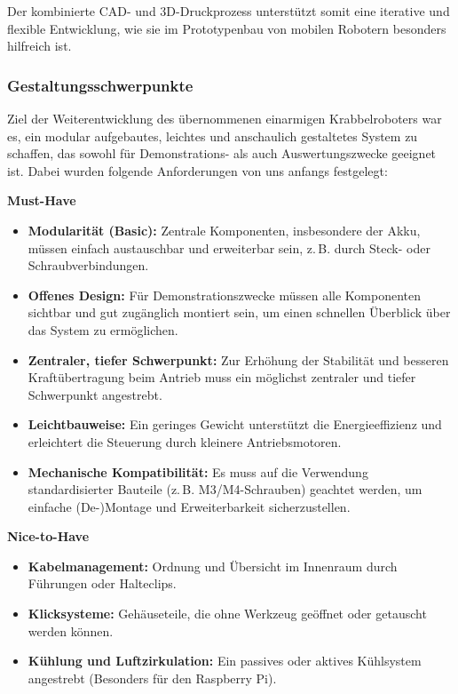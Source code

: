 Der kombinierte CAD- und 3D-Druckprozess unterstützt somit eine iterative und flexible Entwicklung, wie sie im Prototypenbau von mobilen Robotern besonders hilfreich ist.

\subsubsection{Gestaltungsschwerpunkte}

Ziel der Weiterentwicklung des übernommenen einarmigen Krabbelroboters war es, ein modular aufgebautes, leichtes und anschaulich gestaltetes System zu schaffen, das sowohl für Demonstrations- als auch Auswertungszwecke geeignet ist. Dabei wurden folgende Anforderungen von uns anfangs festgelegt:

\textbf{Must-Have}
\begin{itemize}
  \item \textbf{Modularität (Basic):} Zentrale Komponenten, insbesondere der Akku, müssen einfach austauschbar und erweiterbar sein, z.\,B. durch Steck- oder Schraubverbindungen.
  \item \textbf{Offenes Design:} Für Demonstrationszwecke müssen alle Komponenten sichtbar und gut zugänglich montiert sein, um einen schnellen Überblick über das System zu ermöglichen.
  \item \textbf{Zentraler, tiefer Schwerpunkt:} Zur Erhöhung der Stabilität und besseren Kraftübertragung beim Antrieb muss ein möglichst zentraler und tiefer Schwerpunkt angestrebt.
  \item \textbf{Leichtbauweise:} Ein geringes Gewicht unterstützt die Energieeffizienz und erleichtert die Steuerung durch kleinere Antriebsmotoren.
  \item \textbf{Mechanische Kompatibilität:} Es muss auf die Verwendung standardisierter Bauteile (z.\,B. M3/M4-Schrauben) geachtet werden, um einfache (De-)Montage und Erweiterbarkeit sicherzustellen.
\end{itemize}

\textbf{Nice-to-Have}
\begin{itemize}
  \item \textbf{Kabelmanagement:} Ordnung und Übersicht im Innenraum durch Führungen oder Halteclips.
  \item \textbf{Klicksysteme:} Gehäuseteile, die ohne Werkzeug geöffnet oder getauscht werden können.
  \item \textbf{Kühlung und Luftzirkulation:} Ein passives oder aktives Kühlsystem angestrebt (Besonders für den Raspberry Pi).
\end{itemize}

